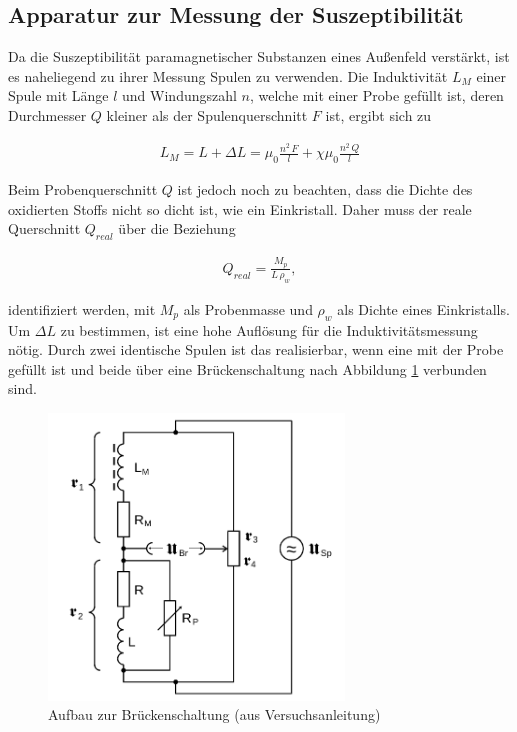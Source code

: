 \subsection{Apparatur zur Messung der Suszeptibilität}
Da die Suszeptibilität paramagnetischer Substanzen eines Außenfeld verstärkt, ist es naheliegend zu ihrer Messung Spulen zu verwenden.
Die Induktivität $L_M$ einer Spule mit Länge $l$ und Windungszahl $n$, welche mit einer Probe gefüllt ist, deren Durchmesser $Q$ kleiner 
als der Spulenquerschnitt $F$ ist, ergibt sich zu

\begin{align}
 L_M = L + \Delta L = \mu_0 \frac{n^2 \,F}{l} + \chi \mu_0\frac {n^2 \, Q}{l}
 \label{eqIndu}
\end{align}

Beim Probenquerschnitt $Q$ ist jedoch noch zu beachten, dass die Dichte des oxidierten Stoffs nicht so dicht ist, wie ein Einkristall. 
Daher muss der reale Querschnitt $Q_{real}$ über die Beziehung

\begin{align}
 Q_{real} = \frac{M_p}{L \, \rho_w},
\end{align}

identifiziert werden, mit $M_p$ als Probenmasse und $\rho_w$ als Dichte eines Einkristalls. Um $\Delta L$ zu bestimmen, ist eine hohe
Auflösung für die Induktivitätsmessung nötig. Durch zwei identische Spulen ist das realisierbar, wenn eine mit der Probe gefüllt ist und
beide über eine Brückenschaltung nach Abbildung \ref{picBruecke} verbunden sind.

\begin{figure}[H]
 \includegraphics[width=0.7\textwidth]{pics/bruecke.png}
 \caption{Aufbau zur Brückenschaltung (aus Versuchsanleitung)}
 \label{picBruecke}
\end{figure}

